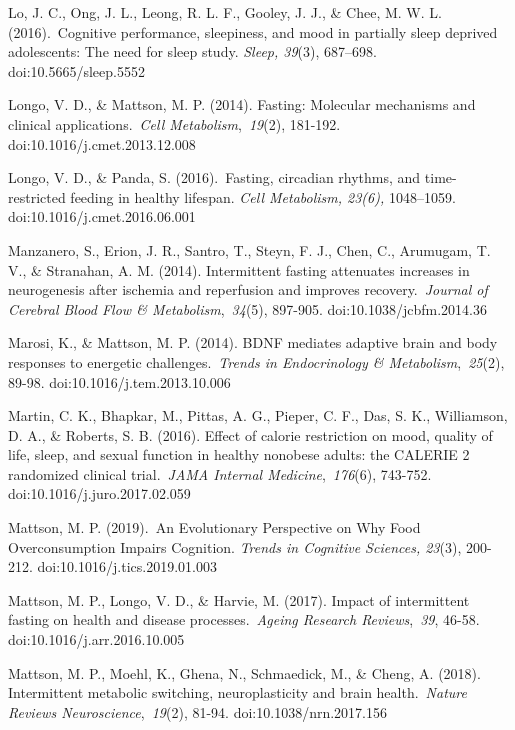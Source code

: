 \documentclass[authordate, empirical]{jote-new-article}
\begin{document}
Lo, J. C., Ong, J. L., Leong, R. L. F., Gooley, J. J., \& Chee, M. W. L. (2016). Cognitive performance, sleepiness, and mood in partially sleep deprived adolescents: The need for sleep study.\emph{ Sleep, 39}(3), 687--698. doi:10.5665/sleep.5552



Longo, V. D., \& Mattson, M. P. (2014). Fasting: Molecular mechanisms and clinical applications. \emph{Cell Metabolism}, \emph{19}(2), 181-192. doi:10.1016/j.cmet.2013.12.008



Longo, V. D., \& Panda, S. (2016). Fasting, circadian rhythms, and time-restricted feeding in healthy lifespan.\emph{ Cell Metabolism, 23(6), }1048--1059.\emph{ }doi:10.1016/j.cmet.2016.06.001



Manzanero, S., Erion, J. R., Santro, T., Steyn, F. J., Chen, C., Arumugam, T. V., \& Stranahan, A. M. (2014). Intermittent fasting attenuates increases in neurogenesis after ischemia and reperfusion and improves recovery. \emph{Journal of Cerebral Blood Flow \& Metabolism}, \emph{34}(5), 897-905. doi:10.1038/jcbfm.2014.36



Marosi, K., \& Mattson, M. P. (2014). BDNF mediates adaptive brain and body responses to energetic challenges. \emph{Trends in Endocrinology \& Metabolism}, \emph{25}(2), 89-98. doi:10.1016/j.tem.2013.10.006



Martin, C. K., Bhapkar, M., Pittas, A. G., Pieper, C. F., Das, S. K., Williamson, D. A., \& Roberts, S. B. (2016). Effect of calorie restriction on mood, quality of life, sleep, and sexual function in healthy nonobese adults: the CALERIE 2 randomized clinical trial. \emph{JAMA Internal Medicine}, \emph{176}(6), 743-752. doi:10.1016/j.juro.2017.02.059



Mattson, M. P. (2019). An Evolutionary Perspective on Why Food Overconsumption Impairs Cognition.\emph{ Trends in Cognitive Sciences, 23}(3), 200-212. doi:10.1016/j.tics.2019.01.003



Mattson, M. P., Longo, V. D., \& Harvie, M. (2017). Impact of intermittent fasting on health and disease processes. \emph{Ageing Research Reviews}, \emph{39}, 46-58. doi:10.1016/j.arr.2016.10.005



Mattson, M. P., Moehl, K., Ghena, N., Schmaedick, M., \& Cheng, A. (2018). Intermittent metabolic switching, neuroplasticity and brain health. \emph{Nature Reviews Neuroscience}, \emph{19}(2), 81-94. doi:10.1038/nrn.2017.156
\end{document}
